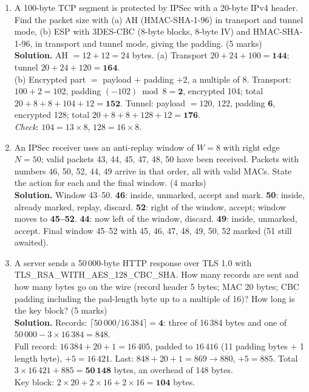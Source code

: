 \begin{enumerate}[leftmargin=1.6em,itemsep=4pt]
  \item A 100-byte TCP segment is protected by IPSec with a 20-byte IPv4 header. Find the packet size with (a) AH (HMAC-SHA-1-96) in transport and tunnel mode, (b) ESP with 3DES-CBC (8-byte blocks, 8-byte IV) and HMAC-SHA-1-96, in transport and tunnel mode, giving the padding. \hfill (5 marks)\\
  \textbf{Solution.} AH $= 12 + 12 = 24$ bytes. (a) Transport $20 + 24 + 100 = \mathbf{144}$; tunnel $20 + 24 + 120 = \mathbf{164}$.\\
  (b) Encrypted part $=$ payload $+$ padding $+ 2$, a multiple of 8. Transport: $100 + 2 = 102$, padding $(-102) \bmod 8 = \mathbf{2}$, encrypted 104; total $20 + 8 + 8 + 104 + 12 = \mathbf{152}$. Tunnel: payload $= 120$, $122$, padding $\mathbf{6}$, encrypted 128; total $20 + 8 + 8 + 128 + 12 = \mathbf{176}$.\\
  \emph{Check}: $104 = 13 \times 8$, $128 = 16 \times 8$.

  \item An IPSec receiver uses an anti-replay window of $W = 8$ with right edge $N = 50$; valid packets 43, 44, 45, 47, 48, 50 have been received. Packets with numbers 46, 50, 52, 44, 49 arrive in that order, all with valid MACs. State the action for each and the final window. \hfill (4 marks)\\
  \textbf{Solution.} Window 43--50. \textbf{46}: inside, unmarked, accept and mark. \textbf{50}: inside, already marked, replay, discard. \textbf{52}: right of the window, accept; window moves to \textbf{45--52}. \textbf{44}: now left of the window, discard. \textbf{49}: inside, unmarked, accept. Final window 45--52 with 45, 46, 47, 48, 49, 50, 52 marked (51 still awaited).

  \item A server sends a 50\,000-byte HTTP response over TLS 1.0 with TLS\_RSA\_WITH\_AES\_128\_CBC\_SHA. How many records are sent and how many bytes go on the wire (record header 5 bytes; MAC 20 bytes; CBC padding including the pad-length byte up to a multiple of 16)? How long is the key block? \hfill (5 marks)\\
  \textbf{Solution.} Records: $\lceil 50\,000/16\,384 \rceil = \mathbf{4}$: three of 16\,384 bytes and one of $50\,000 - 3 \times 16\,384 = 848$.\\
  Full record: $16\,384 + 20 + 1 = 16\,405$, padded to $16\,416$ (11 padding bytes $+$ 1 length byte), $+5 = 16\,421$. Last: $848 + 20 + 1 = 869 \to 880$, $+5 = 885$. Total $3 \times 16\,421 + 885 = \mathbf{50\,148}$ bytes, an overhead of 148 bytes.\\
  Key block: $2 \times 20 + 2 \times 16 + 2 \times 16 = \mathbf{104}$ bytes.


\end{enumerate}
